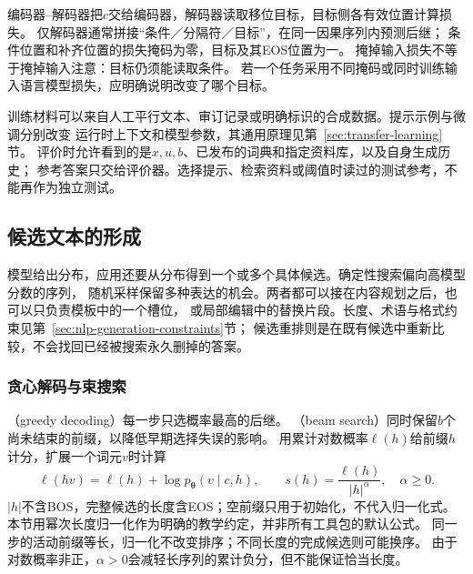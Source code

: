编码器--解码器把$c$交给编码器，解码器读取移位目标，目标侧各有效位置计算损失。
仅解码器通常拼接“条件／分隔符／目标”，在同一因果序列内预测后继；
条件位置和补齐位置的损失掩码为零，目标及其EOS位置为一。
掩掉输入损失不等于掩掉输入注意：目标仍须能读取条件。
若一个任务采用不同掩码或同时训练输入语言模型损失，应明确说明改变了哪个目标。

训练材料可以来自人工平行文本、审订记录或明确标识的合成数据。提示示例与微调分别改变
运行时上下文和模型参数，其通用原理见第~\ref{sec:transfer-learning}节。
评价时允许看到的是$x,u,b$、已发布的词典和指定资料库，以及自身生成历史；
参考答案只交给评价器。选择提示、检索资料或阈值时读过的测试参考，不能再作为独立测试。

\subsection{候选文本的形成}
\label{sec:nlp-generation-candidates}

模型给出分布，应用还要从分布得到一个或多个具体候选。确定性搜索偏向高模型分数的序列，
随机采样保留多种表达的机会。两者都可以接在内容规划之后，也可以只负责模板中的一个槽位，
或局部编辑中的替换片段。长度、术语与格式约束见第~\ref{sec:nlp-generation-constraints}节；
候选重排则是在既有候选中重新比较，不会找回已经被搜索永久删掉的答案。

\subsubsection{贪心解码与束搜索}
\label{sec:nlp-generation-beam}

（greedy decoding）每一步只选概率最高的后继。
（beam search）同时保留$b$个尚未结束的前缀，以降低早期选择失误的影响。
用累计对数概率$\ell(h)$给前缀$h$计分，扩展一个词元$v$时计算
\begin{equation}
  \ell(hv)=\ell(h)+\log p_{\bm{\theta}}(v\mid c,h),
  \qquad s(h)=\frac{\ell(h)}{|h|^\alpha},\quad \alpha\geq0.
  \label{eq:nlp-generation-beam-score}
\end{equation}
$|h|$不含BOS，完整候选的长度含EOS；空前缀只用于初始化，不代入归一化式。
本节用幂次长度归一化作为明确的教学约定，并非所有工具包的默认公式。
同一步的活动前缀等长，归一化不改变排序；不同长度的完成候选则可能换序。
由于对数概率非正，$\alpha>0$会减轻长序列的累计负分，但不能保证恰当长度。

